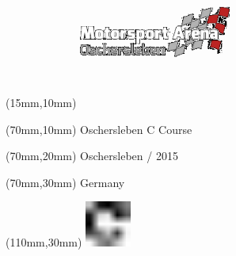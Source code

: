 \null\newpage
\begin{textblock*}{50mm}(15mm,10mm)%
\includegraphics[width=50mm]{LG/OSC.png}
\end{textblock*}
\begin{textblock*}{130mm}(70mm,10mm)%
{\fontsize{20}{20}\selectfont Oschersleben C Course}\\
\end{textblock*}
\begin{textblock*}{120mm}(70mm,20mm)%
{\fontsize{16}{16}\selectfont Oschersleben / 2015}\\
\end{textblock*}
\begin{textblock*}{120mm}(70mm,30mm)%
{\fontsize{12}{12}\selectfont Germany}
\end{textblock*}
\begin{textblock*}{30mm}(110mm,30mm)%
\centering
\includegraphics[height=15mm]{icons/fa-rotate-right.pdf}
\end{textblock*}

